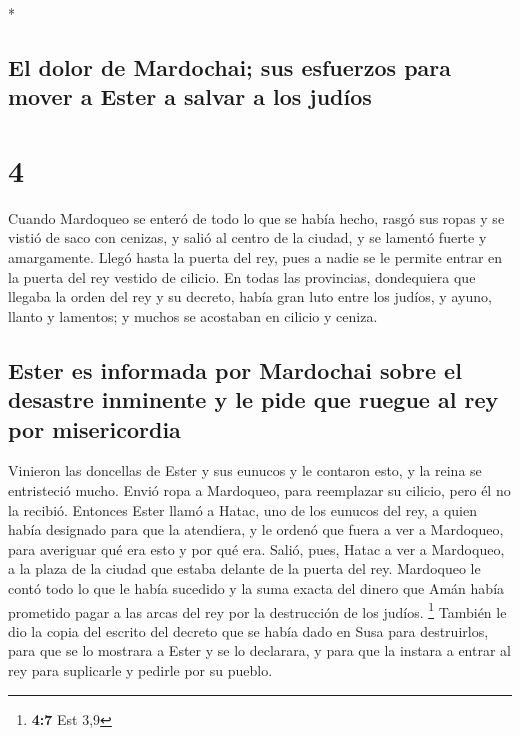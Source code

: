 \begin{paracol}{2}
\begin{otherlanguage}{english}
\end{otherlanguage}

\switchcolumn[0]*

\hypertarget{el-dolor-de-mardochai-sus-esfuerzos-para-mover-a-ester-a-salvar-a-los-juduxedos}{%
\subsection{El dolor de Mardochai; sus esfuerzos para mover a Ester a
salvar a los
judíos}\label{el-dolor-de-mardochai-sus-esfuerzos-para-mover-a-ester-a-salvar-a-los-juduxedos}}

\hypertarget{section-6}{%
\section{4}\label{section-6}}

 Cuando Mardoqueo se enteró de todo lo que se había hecho,
rasgó sus ropas y se vistió de saco con cenizas, y salió al centro de la
ciudad, y se lamentó fuerte y amargamente.  Llegó hasta la
puerta del rey, pues a nadie se le permite entrar en la puerta del rey
vestido de cilicio.  En todas las provincias, dondequiera
que llegaba la orden del rey y su decreto, había gran luto entre los
judíos, y ayuno, llanto y lamentos; y muchos se acostaban en cilicio y
ceniza.

\hypertarget{ester-es-informada-por-mardochai-sobre-el-desastre-inminente-y-le-pide-que-ruegue-al-rey-por-misericordia}{%
\subsection{Ester es informada por Mardochai sobre el desastre inminente
y le pide que ruegue al rey por
misericordia}\label{ester-es-informada-por-mardochai-sobre-el-desastre-inminente-y-le-pide-que-ruegue-al-rey-por-misericordia}}

 Vinieron las doncellas de Ester y sus eunucos y le
contaron esto, y la reina se entristeció mucho. Envió ropa a Mardoqueo,
para reemplazar su cilicio, pero él no la recibió. 
Entonces Ester llamó a Hatac, uno de los eunucos del rey, a quien había
designado para que la atendiera, y le ordenó que fuera a ver a
Mardoqueo, para averiguar qué era esto y por qué era. 
Salió, pues, Hatac a ver a Mardoqueo, a la plaza de la ciudad que estaba
delante de la puerta del rey.  Mardoqueo le contó todo lo
que le había sucedido y la suma exacta del dinero que Amán había
prometido pagar a las arcas del rey por la destrucción de los judíos.
\footnote{\textbf{4:7} Est 3,9}  También le dio la copia
del escrito del decreto que se había dado en Susa para destruirlos, para
que se lo mostrara a Ester y se lo declarara, y para que la instara a
entrar al rey para suplicarle y pedirle por su pueblo.


\end{paracol}
